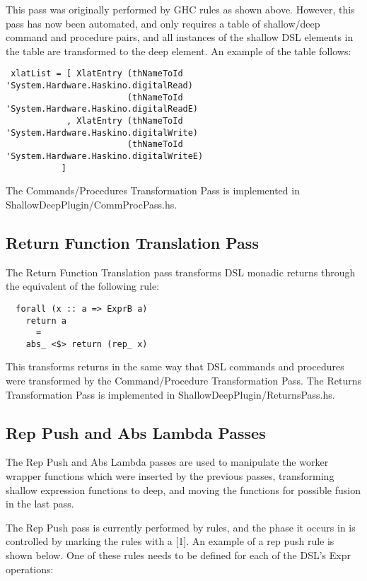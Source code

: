 \documentclass[11pt, oneside]{article}   	%
\begin{document}
This pass was originally performed by GHC rules as shown above.  However,
this pass has now been automated, and only requires a table of shallow/deep
command and procedure pairs, and all instances of the shallow DSL elements
in the table are transformed to the deep element. An example of the table follows:

\begin{verbatim}
 xlatList = [ XlatEntry (thNameToId 'System.Hardware.Haskino.digitalRead)
                        (thNameToId 'System.Hardware.Haskino.digitalReadE)
            , XlatEntry (thNameToId 'System.Hardware.Haskino.digitalWrite)
                        (thNameToId 'System.Hardware.Haskino.digitalWriteE)
           ]
\end{verbatim}

The Commands/Procedures Transformation Pass is implemented in ShallowDeepPlugin/CommProcPass.hs.

\subsection{Return Function Translation Pass}

The Return Function Translation pass transforms DSL monadic returns through
the equivalent of the following rule:

\begin{verbatim}
  forall (x :: a => ExprB a)
    return a
      =
    abs_ <$> return (rep_ x)
\end{verbatim}

This transforms returns in the same way that DSL commands and procedures
were transformed by the Command/Procedure Transformation Pass.
The Returns Transformation Pass is implemented in ShallowDeepPlugin/ReturnsPass.hs.

\subsection{Rep Push and Abs Lambda Passes}

The Rep Push and Abs Lambda passes are used to manipulate the worker
wrapper functions which were inserted by the previous passes, transforming
shallow expression functions to deep, and moving the functions for
possible fusion in the last pass.

The Rep Push pass is currently performed by rules, and the phase it occurs in
is controlled by marking the rules with a [1].  An example of a rep push rule
is shown below.  One of these rules needs to be defined for each of the DSL's
Expr operations:
\end{document}

